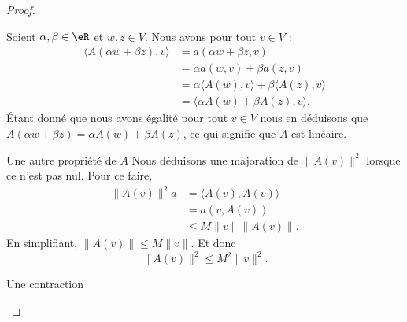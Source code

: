 \begin{proof}
\begin{subproof}
		Soient \( \alpha,\beta\in \eR\) et \( w,z\in V\). Nous avons pour tout \( v\in V\) :
		\begin{subequations}
			\begin{align}
				\langle  A(\alpha w+\beta z), v\rangle & =a(\alpha w+\beta z,v)                                     \\
				                                       & =\alpha a(w,v)+\beta a(z,v)                                \\
				                                       & =\alpha\langle A(w), v\rangle +\beta\langle A(z), v\rangle \\
				                                       & =\langle \alpha A(w)+\beta A(z), v\rangle .
			\end{align}
		\end{subequations}
		Étant donné que nous avons égalité pour tout \( v\in V\) nous en déduisons que \( A(\alpha w+\beta z)=\alpha A(w)+\beta A(z)\), ce qui signifie que \( A \) est linéaire.
		\item[Une autre propriété de \( A\) ]
		Nous déduisons une majoration de \( \| A(v) \|^2\) lorsque ce n'est pas nul. Pour ce faire,
		\begin{subequations}
			\begin{align}
				\| A(v) \|^2a & =\langle A(v), A(v)\rangle \\
				              & =a(v,A(v))                 \\
				              & \leq M\| v \|\| A(v) \|.
			\end{align}
		\end{subequations}
		En simplifiant, \( \| A(v) \|\leq M\| v \|\). Et donc
		\begin{equation}        \label{EQooBQAHooAZRdAW}
			\| A(v) \|^2\leq M^2\| v \|^2.
		\end{equation}
		\item[Une contraction]


\end{subproof}
\end{proof}
